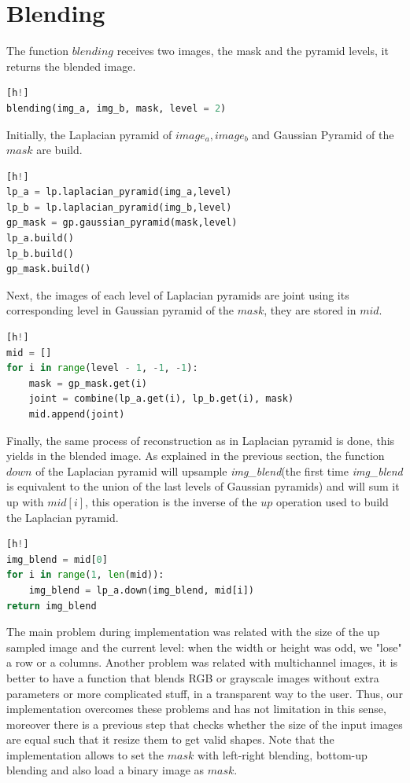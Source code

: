 \section{Blending}

The function $blending$ receives two images, the mask and the pyramid levels, it returns the blended image.

\begin{lstlisting}[language=python][h!]
blending(img_a, img_b, mask, level = 2)
\end{lstlisting}

Initially, the Laplacian pyramid of $image_a, image_b$ and Gaussian Pyramid of the $mask$ are build.

\begin{lstlisting}[language=python][h!]
lp_a = lp.laplacian_pyramid(img_a,level)
lp_b = lp.laplacian_pyramid(img_b,level)
gp_mask = gp.gaussian_pyramid(mask,level)
lp_a.build()
lp_b.build()
gp_mask.build()
\end{lstlisting}

Next, the images of each level of Laplacian pyramids are joint using its corresponding level in Gaussian pyramid of the $mask$, they are stored in $mid$.

\begin{lstlisting}[language=python][h!]
mid = []
for i in range(level - 1, -1, -1):
    mask = gp_mask.get(i)
    joint = combine(lp_a.get(i), lp_b.get(i), mask)
    mid.append(joint)
\end{lstlisting}

Finally, the same process of reconstruction as in Laplacian pyramid is done, this  yields in the blended image. As explained in the previous section, the function $down$ of the Laplacian pyramid will upsample \textit{img\_blend}(the first time \textit{img\_blend} is equivalent to the union of the last levels of Gaussian pyramids) and will sum it up with $mid[i]$, this operation is the inverse of the $up$ operation used to build the Laplacian pyramid.

\begin{lstlisting}[language=python][h!]
img_blend = mid[0]
for i in range(1, len(mid)):
	img_blend = lp_a.down(img_blend, mid[i])
return img_blend
\end{lstlisting}

The main problem during implementation was related with the size of the up sampled image and the current level: when the width or height was odd, we "lose" a row or a columns. Another problem was related with multichannel images, it is better to have a function that blends RGB or grayscale images without extra parameters or more complicated stuff, in a transparent way to the user. Thus, our implementation overcomes these problems and has not limitation in this sense, moreover there is a previous step that checks whether the size of the input images are equal such that it resize them to get valid shapes. Note that the implementation allows to set the $mask$ with left-right blending, bottom-up blending and also load a binary image as $mask$.

